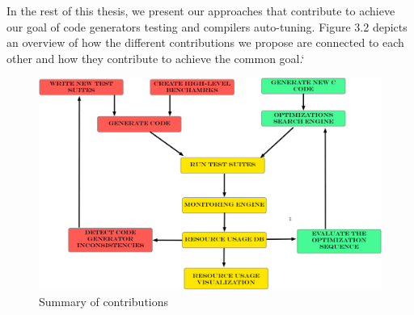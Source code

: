 

In the rest of this thesis, we present our approaches that contribute to achieve our goal of code generators testing and compilers auto-tuning. Figure 3.2 depicts an overview of how the different contributions we propose are connected to each other and how they contribute to achieve the common goal.`

\begin{figure}[h]
	\center
	\includegraphics[scale=0.23]{Chapitre0/fig/overview}
	\caption{Summary of contributions}
\end{figure}

